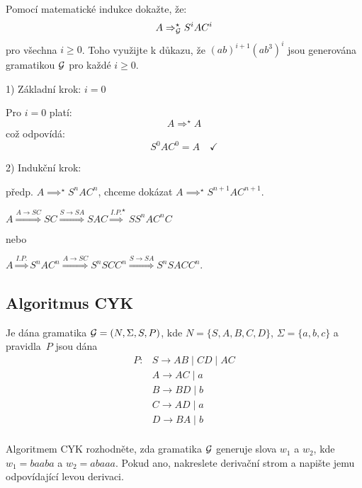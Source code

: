 Pomocí matematické indukce dokažte, že:
\[
A \Rightarrow_{\mathcal{G}}^{\star} S^i A C^i
\]
pro všechna $i \geq 0$. Toho využijte k důkazu, že $(ab)^{i+1}(ab^3)^i$ jsou generována gramatikou $\mathcal{G}$ pro
každé $i \geq 0$.

1) Základní krok: $i = 0$

Pro $i = 0$ platí:
\[
A {\Longrightarrow^\star} A
\]
což odpovídá:
\[
S^0 A C^0 = A \quad \checkmark
\]

2) Indukční krok:

předp. $A {\implies^\star} S^n A C^n$, chceme dokázat $A \implies^{\star} S^{n+1} A C^{n+1}$.

$A \stackrel{A \rightarrow SC}{\Longrightarrow} SC \stackrel{S \rightarrow SA}{\Longrightarrow} SAC \stackrel{I.P.}
{\Longrightarrow}^{\star} SS^nAC^nC$

nebo

$A \stackrel{I.P.}{\Longrightarrow} S^n A C^n \stackrel{A \rightarrow SC}{\Longrightarrow} S^nSCC^n \stackrel
{S \rightarrow SA}{\Longrightarrow} S^nSACC^n$.

\newpage
\subsection{Algoritmus CYK} %
Je dána gramatika $\mathcal{G} = (N, \Sigma, S, P )$, kde $N = \{S, A, B, C, D\}$, $\Sigma = \{a, b, c\}$ a
pravidla~$P$ jsou dána
\begin{align*}
    P: & S \rightarrow AB \mid CD \mid AC\\
    & A \rightarrow AC \mid a \\
    & B \rightarrow BD \mid b \\
    & C \rightarrow AD \mid a \\
    & D \rightarrow BA \mid b \\
\end{align*}

Algoritmem CYK rozhodněte, zda gramatika $\mathcal{G}$ generuje slova $w_1$ a $w_2$, kde $w_1 = baaba$ a $w_2 = abaaa$.
Pokud ano, nakreslete derivační strom a napište jemu odpovídající levou derivaci.

